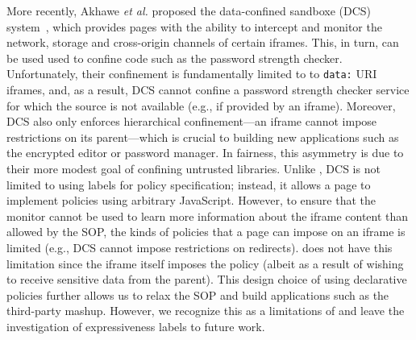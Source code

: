 More recently, Akhawe \emph{et al.} proposed the data-confined
sandboxe (DCS) system~\cite{Akhawe2013}, which provides pages with the
ability to intercept and monitor the network, storage and cross-origin
channels of certain iframes.
%
This, in turn, can be used used to confine code such as the password
strength checker.
%
Unfortunately, their confinement is fundamentally limited to to
\verb|data:| URI iframes, and, as a result, DCS cannot confine a
password strength checker service for which the source is not
available (e.g., if provided by an iframe).
%
Moreover, DCS also only enforces hierarchical confinement---an iframe
cannot impose restrictions on its parent---which is crucial to
building new applications such as the encrypted editor or password
manager.
%
In fairness, this asymmetry is due to their more modest goal of
confining untrusted libraries.
%
Unlike \sys{}, DCS is not limited to using labels for policy
specification; instead, it allows a page to implement policies using
arbitrary JavaScript.
%
However, to ensure that the monitor cannot be used to learn more
information about the iframe content than allowed by the SOP, the
kinds of policies that a page can impose on an iframe is limited
(e.g., DCS cannot impose restrictions on redirects).
%
\sys{} does not have this limitation since the iframe itself imposes
the policy (albeit as a result of wishing to receive sensitive data
from the parent).
%
This design choice of using declarative policies further allows us to
relax the SOP and build applications such as the third-party mashup.
%
However, we recognize this as a limitations of \sys{} and leave the
investigation of expressiveness labels to future work.




